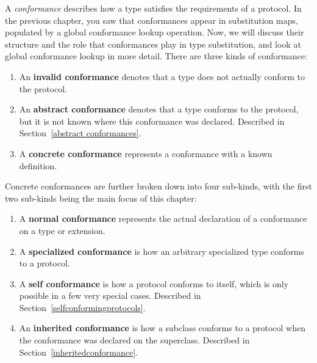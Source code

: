 \documentclass[a4paper,headsepline,bibliography=totoc,toc=flat,fleqn,twoside=semi]{scrbook}
\theoremstyle{definition}
\theoremstyle{definition}
\theoremstyle{definition}
\begin{document}
A \emph{conformance} describes how a type satisfies the requirements of a protocol. In the previous chapter, you saw that conformances appear in substitution maps, populated by a global conformance lookup operation. Now, we will discuss their structure and the role that conformances play in type substitution, and look at global conformance lookup in more detail. There are three kinds of conformance:
\begin{enumerate}
\item An \textbf{invalid conformance} denotes that a type does not actually conform to the protocol.
\item An \textbf{abstract conformance} denotes that a type conforms to the protocol, but it is not known where this conformance was declared. Described in Section~\ref{abstract conformances}.
\item A \textbf{concrete conformance} represents a conformance with a known definition.
\end{enumerate}
Concrete conformances are further broken down into four sub-kinds, with the first two sub-kinds being the main focus of this chapter:
\begin{enumerate}
\item A \textbf{normal conformance} represents the actual declaration of a conformance on a type or extension.
\item A \textbf{specialized conformance} is how an arbitrary specialized type conforms to a protocol.
\item A \textbf{self conformance} is how a protocol conforms to itself, which is only possible in a few very special cases. Described in Section~\ref{selfconformingprotocols}.
\item An \textbf{inherited conformance} is how a subclass conforms to a protocol when the conformance was declared on the superclass. Described in Section~\ref{inheritedconformance}.
\end{enumerate}

\end{document}
